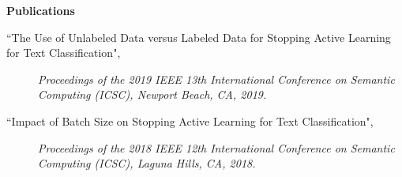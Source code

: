 \documentclass[letterpaper,10pt]{article}
\newcommand{\resheading}[1]{{\large \colorbox{mygrey}{\begin{minipage}{\textwidth}{\textbf{#1 \vphantom{p\^{E}}}}\end{minipage}}}}
\begin{document}
\resheading{Publications}
\begin{description}
\item[``The Use of Unlabeled Data versus Labeled Data for Stopping Active Learning for Text Classification",]
\emph{Proceedings of the 2019 IEEE 13th International Conference on Semantic Computing (ICSC), Newport Beach, CA, 2019.}
\item[``Impact of Batch Size on Stopping Active Learning for Text Classification",]
\emph{Proceedings of the 2018 IEEE 12th International Conference on Semantic Computing (ICSC), Laguna Hills, CA, 2018.}
\end{description}
\end{document}

